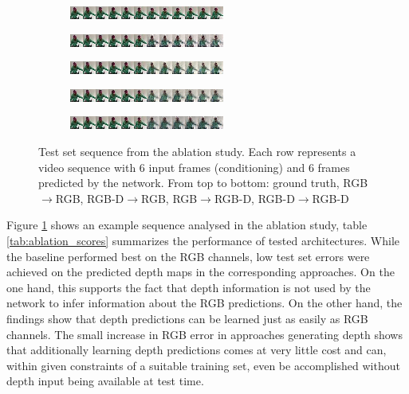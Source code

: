 \documentclass[10pt,twocolumn,letterpaper]{article}
\begin{document}
\begin{figure}[]
	\begin{subfigure}[b]{0.5\textwidth}
		\centering
		\includegraphics[width=\textwidth]{graphics/ground_truth.png}
	\end{subfigure}
	\begin{subfigure}[b]{0.5\textwidth}
		\centering
		\includegraphics[width=\textwidth]{graphics/nodepth.png}
	\end{subfigure}
	\begin{subfigure}[b]{0.5\textwidth}
		\centering
		\includegraphics[width=\textwidth]{graphics/depth_in.png}
	\end{subfigure}
	\begin{subfigure}[b]{0.5\textwidth}
		\centering
		\includegraphics[width=\textwidth]{graphics/depth_out.png}
	\end{subfigure}
	\begin{subfigure}[b]{0.5\textwidth}
		\centering
		\includegraphics[width=\textwidth]{graphics/depth.png}
	\end{subfigure}
	\caption{Test set sequence from the ablation study. Each row represents a video sequence with 6 input frames (conditioning) and 6 frames predicted by the network. From top to bottom: ground truth, RGB$\rightarrow$RGB, RGB-D$\rightarrow$RGB, RGB$\rightarrow$RGB-D, RGB-D$\rightarrow$RGB-D}
	\label{fig:ablation_images}
\end{figure}

Figure \ref{fig:ablation_images} shows an example sequence analysed in the ablation study, table \ref{tab:ablation_scores} summarizes the performance of tested architectures. While the baseline performed best on the RGB channels, low test set errors were achieved on the predicted depth maps in the corresponding approaches.
On the one hand, this supports the fact that depth information is not used by the network to infer information about the RGB predictions. On the other hand, the findings show that depth predictions can be learned just as easily as RGB channels. The small increase in RGB error in approaches generating depth shows that additionally learning depth predictions comes at very little cost and can, within given constraints of a suitable training set, even be accomplished without depth input being available at test time.
\end{document}
